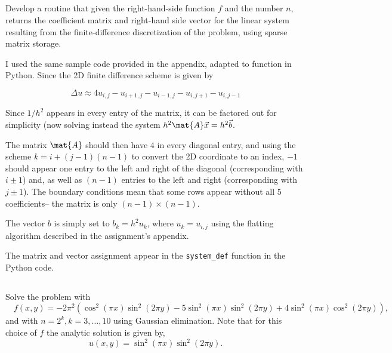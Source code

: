 \documentclass{template}
\begin{document}
\subsection{}

Develop a routine that given the right-hand-side function $f$ and 
the number $n$, returns the coefficient matrix and right-hand side vector 
for the linear system resulting from the finite-difference
discretization of the problem, using sparse matrix storage.

I used the same sample code provided in the appendix, adapted to function in Python. Since the 2D finite difference scheme is given by

\begin{equation}
    \Delta u \approx 4u_{i,j} - u_{i+1,j} - u_{i-1,j} - u_{i,j+1} - u_{i, j-1}
\end{equation}

Since $1/h^2$ appears in every entry of the matrix, it can be factored out for simplicity (now solving instead the system $h^2\mat{A}\vec{x} = h^2\vec{b}$.

The matrix $\mat{A}$ should then have $4$ in every diagonal entry, and using the scheme $k=i + (j-1)(n-1)$ to convert the 2D coordinate to an index, $-1$ should appear one entry to the left and right of the diagonal (corresponding with $i\pm1$) and, as well as $(n-1)$ entries to the left and right (corresponding with $j \pm 1$). The boundary conditions mean that some rows appear without all 5 coefficients-- the matrix is only $(n-1)\times(n-1)$.

The vector $b$ is simply set to $b_k = h^2u_k$, where $u_k = u_{i,j}$ using the flatting algorithm described in the assignment's appendix.

The matrix and vector assignment appear in the \verb|system_def| function in the Python code.


\subsection{}
Solve the problem with 
\begin{equation}\label{equ:rhs}
   \quad 
   f(x, y) = -2\pi^2(\cos^2(\pi x)\sin^2(2\pi y)-5\sin^2(\pi x)\sin^2(2\pi y)+4\sin^2(\pi x)\cos^2(2\pi y)),
\end{equation} 
and with $n = 2^k, k = 3, 
\ldots, 10$ using Gaussian elimination. Note that for this choice of $f$ the analytic solution is given by,
\[
   u(x, y) = \sin^2(\pi x) \sin^2(2\pi y).
\]
\end{document}
